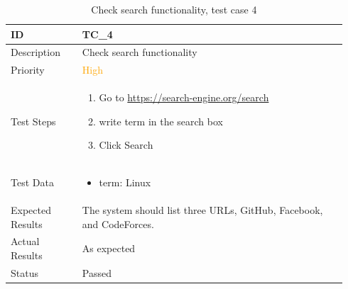 \documentclass{scrartcl}
\begin{document}
\begin{table}[H]
  \caption{Check search functionality, test case 4}
  \begin{tabular}{p{0.2\linewidth} | p{0.74\linewidth}}
    \toprule
    ID & TC\_4
    \\\midrule
    Description & Check search functionality
    \\\hline
    Priority & \textcolor{orange}{High}
    \\\hline
    Test Steps & {
                 \begin{enumerate}
                 \item Go to \url{https://search-engine.org/search}
                 \item write term in the search box
                 \item Click Search
                 \end{enumerate}
                 }\vspace*{-\baselineskip}
    \\\hline
    Test Data & {
                \begin{itemize}
                \item term: Linux
                \end{itemize}
                }\vspace*{-\baselineskip}
    \\\hline
    Expected Results & The system should list three URLs, GitHub, Facebook, and CodeForces.
    \\\hline
    Actual Results & As expected
    \\\hline
    Status & Passed
    \\\bottomrule
  \end{tabular}
\end{table}
\end{document}

